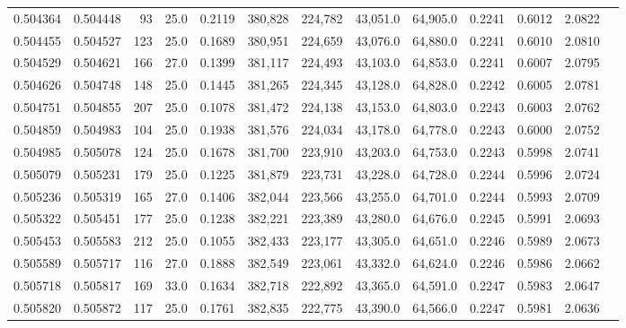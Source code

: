 \begin{tabular}{rrrrrrrrrrrrr}
0.504364 & 0.504448 &    93 & 25.0 &                                     0.2119 & 380,828 & 224,782 &  43,051.0 &  64,905.0 & 0.2241 & 0.6012 & 2.0822 \\
0.504455 & 0.504527 &   123 & 25.0 &                                     0.1689 & 380,951 & 224,659 &  43,076.0 &  64,880.0 & 0.2241 & 0.6010 & 2.0810 \\
0.504529 & 0.504621 &   166 & 27.0 &                                     0.1399 & 381,117 & 224,493 &  43,103.0 &  64,853.0 & 0.2241 & 0.6007 & 2.0795 \\
0.504626 & 0.504748 &   148 & 25.0 &                                     0.1445 & 381,265 & 224,345 &  43,128.0 &  64,828.0 & 0.2242 & 0.6005 & 2.0781 \\
0.504751 & 0.504855 &   207 & 25.0 &                                     0.1078 & 381,472 & 224,138 &  43,153.0 &  64,803.0 & 0.2243 & 0.6003 & 2.0762 \\
0.504859 & 0.504983 &   104 & 25.0 &                                     0.1938 & 381,576 & 224,034 &  43,178.0 &  64,778.0 & 0.2243 & 0.6000 & 2.0752 \\
0.504985 & 0.505078 &   124 & 25.0 &                                     0.1678 & 381,700 & 223,910 &  43,203.0 &  64,753.0 & 0.2243 & 0.5998 & 2.0741 \\
0.505079 & 0.505231 &   179 & 25.0 &                                     0.1225 & 381,879 & 223,731 &  43,228.0 &  64,728.0 & 0.2244 & 0.5996 & 2.0724 \\
0.505236 & 0.505319 &   165 & 27.0 &                                     0.1406 & 382,044 & 223,566 &  43,255.0 &  64,701.0 & 0.2244 & 0.5993 & 2.0709 \\
0.505322 & 0.505451 &   177 & 25.0 &                                     0.1238 & 382,221 & 223,389 &  43,280.0 &  64,676.0 & 0.2245 & 0.5991 & 2.0693 \\
0.505453 & 0.505583 &   212 & 25.0 &                                     0.1055 & 382,433 & 223,177 &  43,305.0 &  64,651.0 & 0.2246 & 0.5989 & 2.0673 \\
0.505589 & 0.505717 &   116 & 27.0 &                                     0.1888 & 382,549 & 223,061 &  43,332.0 &  64,624.0 & 0.2246 & 0.5986 & 2.0662 \\
0.505718 & 0.505817 &   169 & 33.0 &                                     0.1634 & 382,718 & 222,892 &  43,365.0 &  64,591.0 & 0.2247 & 0.5983 & 2.0647 \\
0.505820 & 0.505872 &   117 & 25.0 &                                     0.1761 & 382,835 & 222,775 &  43,390.0 &  64,566.0 & 0.2247 & 0.5981 & 2.0636 \\

\end{tabular}
